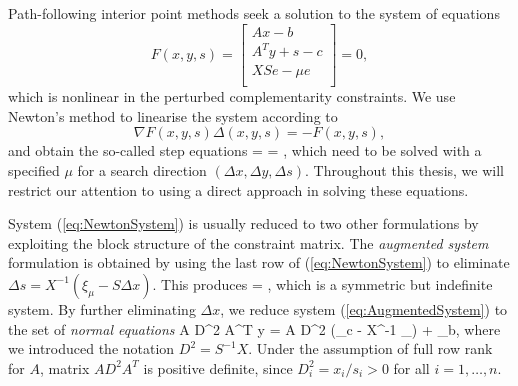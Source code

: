 Path-following interior point methods seek a solution 
to the system of equations
\[
F(x,y,s) = \left[
  \begin{array}{c}
    Ax-b \\
    A^Ty+s-c \\
    XSe - \mu e \\
  \end{array} \right] = 0,
\]
which is nonlinear in the perturbed complementarity constraints.
We use Newton's method to linearise the system according to
\[
\nabla F(x,y,s) \Delta(x,y,s) = -F(x,y,s),
\]
and obtain the so-called step equations
%
\be \label{eq:NewtonSystem}
 =
 =
\left[ \begin{array}{c}
    \xi_b \\ \xi_c \\ \xi_\mu
   \end{array} \right],
\ee
%
which need to be solved with a specified $\mu$ for a search direction
$(\Delta x, \Delta y, \Delta s)$. Throughout this thesis, we will 
restrict our attention to using a direct approach in solving these
equations.

System (\ref{eq:NewtonSystem}) is usually reduced to two other
formulations by exploiting the block structure of the constraint
matrix.
%
The {\em augmented system} formulation is obtained by using 
the last row of (\ref{eq:NewtonSystem}) to eliminate
$\Delta s = X^{-1} (\xi_\mu - S\Delta x)$.
This produces
%
\be \label{eq:AugmentedSystem}
\left[ \begin{array}{cc}
    -X^{-1}S & A^T \\ A & 0
  \end{array} \right]
 =
\left[ \begin{array}{c}
    \xi_c - X^{-1}\xi_\mu \\ \xi_b
   \end{array} \right],
\ee
which is a symmetric but indefinite system.
%
By further eliminating $\Delta x$, we reduce system 
(\ref{eq:AugmentedSystem}) to the set of {\em normal equations}
%
\be \label{eq:NormalEquations}
  A D^2 A^T \Delta y = A D^2 (\xi_c - X^{-1} \xi_\mu) + \xi_b,
\ee
%
where we introduced the notation $D^2 = S^{-1} X$.
Under the assumption of full row rank for $A$, matrix 
$A D^2 A^T$ is positive definite, since $D^2_i = x_i/s_i > 0$ for
all $i = 1, \ldots, n$.

